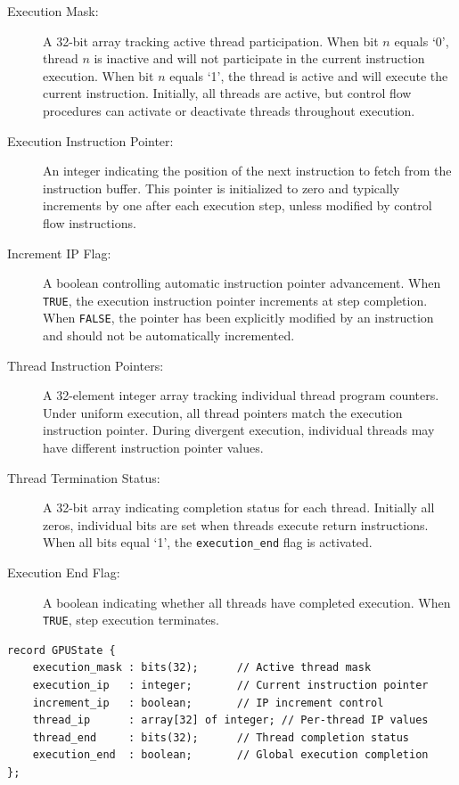 \begin{description}
    \item[Execution Mask:] A 32-bit array tracking active thread participation.
    When bit $n$ equals `0', thread $n$ is inactive and will not participate in
    the current instruction execution. When bit $n$ equals `1', the thread is
    active and will execute the current instruction. Initially, all threads are
    active, but control flow procedures can activate or deactivate threads
    throughout execution.

    \item[Execution Instruction Pointer:] An integer indicating the position of
    the next instruction to fetch from the instruction buffer. This pointer is
    initialized to zero and typically increments by one after each execution
    step, unless modified by control flow instructions.

    \item[Increment IP Flag:] A boolean controlling automatic instruction
    pointer advancement. When \lstinline{TRUE}, the execution instruction
    pointer increments at step completion. When \lstinline{FALSE}, the pointer
    has been explicitly modified by an instruction and should not be
    automatically incremented.

    \item[Thread Instruction Pointers:] A 32-element integer array tracking
    individual thread program counters. Under uniform execution, all thread
    pointers match the execution instruction pointer. During divergent
    execution, individual threads may have different instruction pointer
    values.

    \item[Thread Termination Status:] A 32-bit array indicating completion
    status for each thread. Initially all zeros, individual bits are set when
    threads execute return instructions. When all bits equal `1', the
    \lstinline{execution_end} flag is activated.

    \item[Execution End Flag:] A boolean indicating whether all threads have
    completed execution. When \lstinline{TRUE}, step execution terminates.
\end{description}

\begin{lstlisting}[caption={GPU Execution State Definition}, label={lst:gpu_state}]
record GPUState {
    execution_mask : bits(32);      // Active thread mask
    execution_ip   : integer;       // Current instruction pointer
    increment_ip   : boolean;       // IP increment control
    thread_ip      : array[32] of integer; // Per-thread IP values
    thread_end     : bits(32);      // Thread completion status
    execution_end  : boolean;       // Global execution completion
};
\end{lstlisting}

